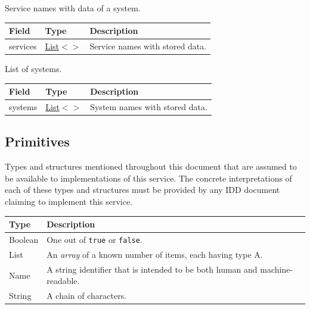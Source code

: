 \documentclass[a4paper]{arrowhead}
\newcommand{\pdef}[1]{{\textcolor{ArrowheadGrey}{#1\label{sec:model:primitives:#1}\label{sec:model:primitives:#1s}\label{sec:model:primitives:#1es}}}}
\newcommand{\pref}[1]{{\textcolor{ArrowheadGrey}{\hyperref[sec:model:primitives:#1]{#1}}}}
\begin{document}
Service names with data of a system.


\noindent\begin{tabularx}{\textwidth}{| >{\raggedright\arraybackslash}p{3.9cm} | >{\raggedright\arraybackslash\small}p{5.3cm} | X |} \hline
\rowcolor{gray!33} Field & Type & Description \\ \hline
services & \pref{List}$<$\allowbreak{}\pref{String}$>$ & Service names with stored data. \\ \hline
\end{tabularx}




List of systems.


\noindent\begin{tabularx}{\textwidth}{| >{\raggedright\arraybackslash}p{3.9cm} | >{\raggedright\arraybackslash\small}p{5.3cm} | X |} \hline
\rowcolor{gray!33} Field & Type & Description \\ \hline
systems & \pref{List}$<$\allowbreak{}\pref{String}$>$ & System names with stored data. \\ \hline
\end{tabularx}



\subsection{Primitives}
\label{sec:model:primitives}

Types and structures mentioned throughout this document that are assumed to be available to implementations of this service.
The concrete interpretations of each of these types and structures must be provided by any IDD document claiming to implement this service.

\noindent\begin{tabularx}{\textwidth}{| p{4.6cm} | X |} \hline
\rowcolor{gray!33} Type & Description \\ \hline
\pdef{Boolean} & One out of \texttt{true} or \texttt{false}. \\ \hline
\pdef{List} & An \textit{array} of a known number of items, each having type A. \\ \hline
\pdef{Name} & A string identifier that is intended to be both human and machine-readable. \\ \hline
\pdef{String} & A chain of characters. \\ \hline
\end{tabularx}
\end{document}
